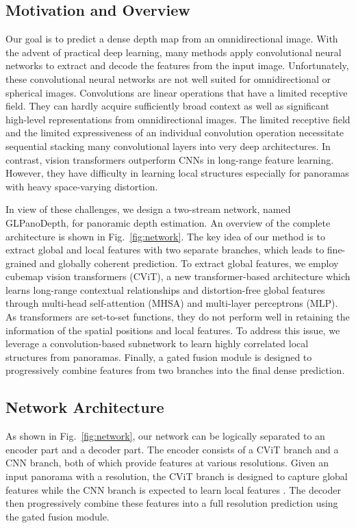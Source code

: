 \documentclass[10pt,twocolumn,letterpaper]{article}
\begin{document}
\subsection{Motivation and Overview}
Our goal is to predict a dense depth map from an omnidirectional image. With the advent of practical deep learning, many methods apply convolutional neural networks to extract and decode the features from the input image.
Unfortunately, these convolutional neural networks are not well suited for omnidirectional or spherical images. 
Convolutions are linear operations that have a limited receptive field. They can hardly acquire sufficiently broad context as well as significant high-level representations from omnidirectional images. The limited receptive field and the limited expressiveness of an individual convolution operation necessitate sequential stacking many convolutional layers into very deep architectures. 
In contrast, vision transformers \cite{vit} outperform CNNs in long-range feature learning. However, they have difficulty in learning local structures especially for panoramas with heavy space-varying distortion.

In view of these challenges, we design a two-stream network, named GLPanoDepth, for panoramic depth estimation. An overview of the complete architecture is shown in Fig.~\ref{fig:network}. The key idea of our method is to extract global and local features with two separate branches, which leads to fine-grained and globally coherent prediction. To extract global features, we employ cubemap vision transformers (CViT), a new transformer-based architecture which learns long-range contextual relationships and distortion-free global features through multi-head self-attention (MHSA) \cite{NIPS2017_3f5ee243} and multi-layer perceptrons (MLP). As transformers are set-to-set functions, they do not perform well in retaining the information of the spatial positions and local features. To address this issue, we leverage a convolution-based subnetwork to learn highly correlated local structures from panoramas. Finally, a gated fusion module is designed to progressively combine features from two branches into the final dense prediction. 

\subsection{Network Architecture}
As shown in Fig.~\ref{fig:network}, our network can be logically separated to an encoder part and a decoder part. The encoder consists of a CViT branch and a CNN branch, both of which provide features at various resolutions. Given an input panorama  with a  resolution, the CViT branch is designed to capture global features  while the CNN branch is expected to learn local features . The decoder then progressively combine these features into a full resolution prediction using the gated fusion module. 
\end{document}

